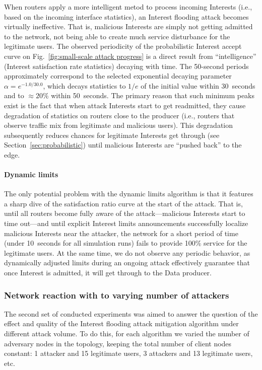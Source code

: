 When routers apply a more intelligent metod to process incoming Interests (i.e., based on the incoming interface statistics), an Interest flooding attack becomes virtually ineffective.
That is, malicious Interests are simply not getting admitted to the network, not being able to create much service disturbance for the legitimate users.
The observed periodicity of the probabilistic Interest accept curve on Fig.~\ref{fig:small-scale attack progress} is a direct result from ``intelligence'' (Interest satisfaction rate statistics) decaying with time.
The 50-second periods approximately correspond to the selected exponential decaying parameter $\alpha=e^{−1.0/30.0}$, which decays statistics to $1/e$ of the initial value within 30~seconds and to $\approx20\%$ within 50~seconds.
The primary reason that such minimum peaks exist is the fact that when attack Interests start to get readmitted, they cause degradation of statistics on routers close to the producer (i.e., routers that observe traffic mix from legitimate and malicious users).
This degradation subsequently reduces chances for legitimate Interests get through (see Section~\ref{sec:probabilistic}) until malicious Interests are ``pushed back'' to the edge.

\paragraph{\textbf{Dynamic limits}}

The only potential problem with the dynamic limits algorithm is that it features a sharp dive of the satisfaction ratio curve at the start of the attack.
That is, until all routers become fully aware of the attack---malicious Interests start to time out---and until explicit Interest limits announcements successfully localize malicious Interests near the attacker, the network for a short period of time (under 10~seconds for all simulation runs) fails to provide 100\% service for the legitimate users.
At the same time, we do not observe any periodic behavior, as dynamically adjusted limits during an ongoing attack effectively guarantee that once Interest is admitted, it will get through to the Data producer.

\subsubsection{Network reaction with to varying number of attackers}

The second set of conducted experiments was aimed to answer the question of the effect and quality of the Interest flooding attack mitigation algorithm under different attack volume.
To do this, for each algorithm we varied the number of adversary nodes in the topology, keeping the total number of client nodes constant: 1 attacker and 15 legitimate users, 3 attackers and 13 legitimate users, etc.

